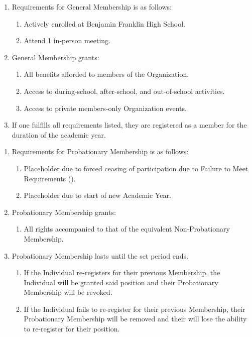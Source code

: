 
\begin{enumerate}
	\item Requirements for General Membership is as follows:
		\begin{enumerate}
			\item Actively enrolled at Benjamin Franklin High School.

			\item Attend 1 in-person meeting.
		\end{enumerate}

	\item General Membership grants:
		\begin{enumerate}
			\item All benefits afforded to members of the Organization.

			\item Access to during-school, after-school, and out-of-school activities.

			\item Access to private members-only Organization events.
		\end{enumerate}

	\item If one fulfills all requirements listed, they are registered as a member
		for the duration of the academic year.
\end{enumerate}


\begin{enumerate}
	\item Requirements for Probationary Membership is as follows:
		\begin{enumerate}
			\item Placeholder due to forced ceasing of participation due to Failure to
				Meet Requirements ().

			\item Placeholder due to start of new Academic Year.
		\end{enumerate}

	\item Probationary Membership grants:
		\begin{enumerate}
			\item All rights accompanied to that of the equivalent Non-Probationary Membership.
		\end{enumerate}

	\item Probationary Membership lasts until the set period ends.
		\begin{enumerate}
			\item If the Individual re-registers for their previous Membership, the
				Individual will be granted said position and their Probationary
				Membership will be revoked.

			\item If the Individual fails to re-register for their previous Membership,
				their Probationary Membership will be removed and their will lose the
				ability to re-register for their position.
		\end{enumerate}
\end{enumerate}

